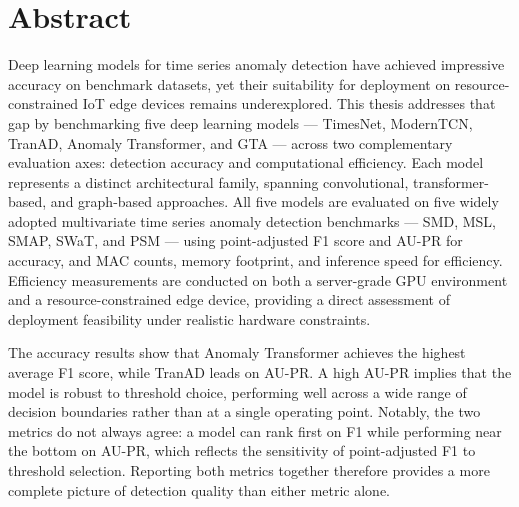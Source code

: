 \documentclass[twoside,11pt,openright]{report}
\begin{document}

\pagestyle{empty} 
\vspace*{\fill}
\clearpage


\pagestyle{plain}
\chapter*{Abstract}

Deep learning models for time series anomaly detection have achieved impressive
accuracy on benchmark datasets, yet their suitability for deployment on
resource-constrained IoT edge devices remains underexplored. This thesis
addresses that gap by benchmarking five deep learning models --- TimesNet,
ModernTCN, TranAD, Anomaly Transformer, and GTA --- across two complementary
evaluation axes: detection accuracy and computational efficiency. Each model
represents a distinct architectural family, spanning convolutional,
transformer-based, and graph-based approaches. All five models are evaluated
on five widely adopted multivariate time series anomaly detection benchmarks
--- SMD, MSL, SMAP, SWaT, and PSM --- using point-adjusted F1 score and
AU-PR for accuracy, and MAC counts, memory footprint, and inference speed
for efficiency. Efficiency measurements are conducted on both a server-grade
GPU environment and a resource-constrained edge device, providing a direct
assessment of deployment feasibility under realistic hardware constraints.

The accuracy results show that Anomaly Transformer achieves the highest average
F1 score, while TranAD leads on AU-PR. A high AU-PR implies that the model is
robust to threshold choice, performing well across a wide range of decision
boundaries rather than at a single operating point. Notably, the two
metrics do not always agree: a model can rank first on F1 while performing near
the bottom on AU-PR, which reflects the sensitivity of point-adjusted F1 to
threshold selection. Reporting both metrics together therefore provides a more
complete picture of detection quality than either metric alone.
\end{document}
